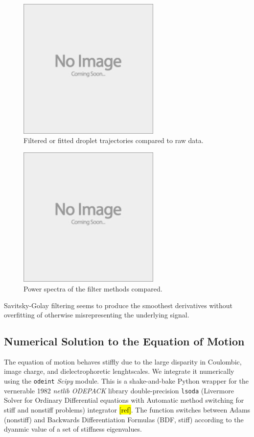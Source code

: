 \documentclass[10pt,a4paper]{article}
\begin{document}
\begin{figure}
  \centerline{\includegraphics[height=7cm,width=7cm]{../figures/placeholder.png}}
  \caption{Filtered or fitted droplet trajectories compared to raw data.}
\label{fig:filters}
\end{figure}

\begin{figure}
  \centerline{\includegraphics[height=7cm,width=7cm]{../figures/placeholder.png}}
  \caption{Power spectra of the filter methods compared.}
\label{fig:power_spectra}
\end{figure}

Savitsky-Golay filtering seems to produce the smoothest derivatives without overfitting of otherwise misrepresenting the underlying signal. 

\subsection*{Numerical Solution to the Equation of Motion}
The equation of motion behaves stiffly due to the large disparity in Coulombic, image charge, and dielectrophoretic lenghtscales. We integrate it numerically using the \verb|odeint| \emph{Scipy} module. This is a shake-and-bake Python wrapper for the vernerable 1982 \emph{netlib ODEPACK} library double-precision \verb|lsoda| (Livermore Solver for Ordinary Differential equations with Automatic method switching for stiff and nonstiff problems) integrator \hl{[ref]}. The function switches between Adams (nonstiff) and Backwards Differentiation Formulas (BDF, stiff) according to the dyanmic value of a set of stiffness eigenvalues.
\end{document}
